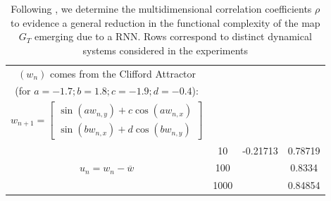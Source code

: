 \documentclass[a4paper,12pt,twoside]{report}
\begin{document}
\begin{center}
\begin{table}
{\begin{tabular}{|c|c| c c |}
          
               \hline  
               $(w_n)$ comes from the Clifford Attractor \\ (for $a = -1.7; b = 1.8; c = -1.9; d = -0.4$): & & & \\
        {$w_{n+1}= \begin{bmatrix} \sin(aw_{n,y}) + c\cos(aw_{n,x}) \\ 
                                                                    \sin(bw_{n,x})+d\cos(bw_{n,y}) \end{bmatrix}$} & & & \\
          \multirow{3}{*}{$u_n = w_n-\overline{w}$}
              & 10 & -0.21713 & 0.78719 \\
              & 100 & &  0.8334 \\
              & 1000 & & 0.84854 \\
           \hline
                \end{tabular}} %
 \label{Table_FC}
 \caption{Following \cite{manjunath2021universal}, we determine the multidimensional correlation coefficients $\rho$ to evidence a general reduction in the functional complexity of the map $G_T$ emerging due to a RNN. Rows correspond to distinct dynamical systems considered in the experiments
}
\end{table}
\end{center}
\end{document}
